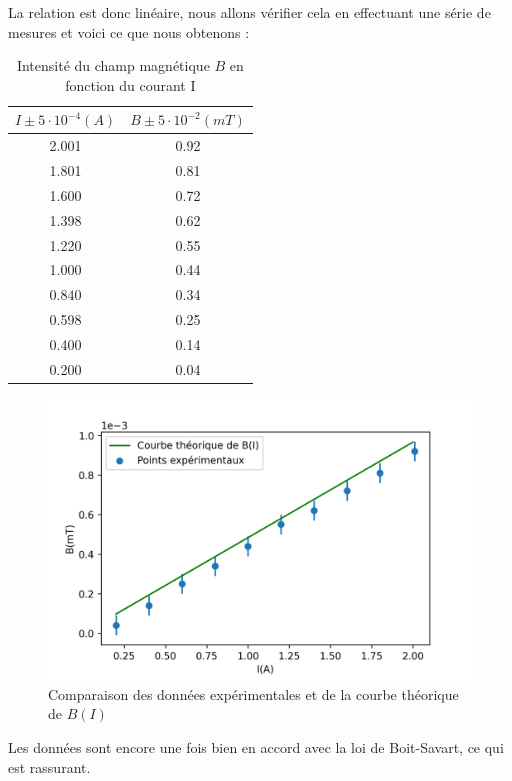 \documentclass[12pt,a4paper]{article}
\begin{document}
La relation est donc linéaire, nous allons vérifier cela en effectuant une série de mesures et voici ce que nous obtenons :
\begin{table}[H]
\begin{center}
\begin{tabular}{|c|c|}
\hline
$I \pm 5\cdot10^{-4} (A)$ & $B\pm 5\cdot10^{-2} (mT)$\\ 
\hline
2.001 & 0.92 \\
\hline
1.801 & 0.81 \\
\hline
1.600 & 0.72 \\
\hline
1.398 & 0.62\\
\hline
1.220 & 0.55\\
\hline
1.000 & 0.44\\
\hline
0.840 & 0.34\\
\hline
0.598 & 0.25\\
\hline
0.400 & 0.14\\
\hline
0.200 & 0.04\\
\hline
\end{tabular}
\caption{Intensité du champ magnétique $B$ en fonction du courant I}
\end{center}
\end{table}
\begin{figure}[H]
\begin{center}
\includegraphics[scale=1]{c2.png}
\caption{Comparaison des données expérimentales et de la courbe théorique de $B(I)$}
\end{center}
\end{figure}
Les données sont encore une fois bien en accord avec la loi de Boit-Savart, ce qui est rassurant.
\end{document}
